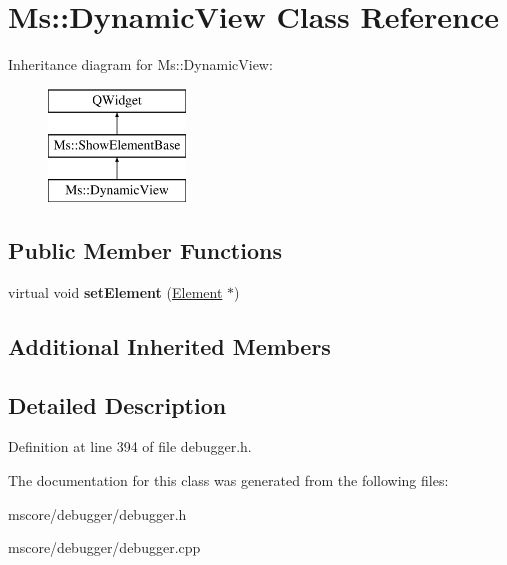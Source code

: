 \hypertarget{class_ms_1_1_dynamic_view}{}\section{Ms\+:\+:Dynamic\+View Class Reference}
\label{class_ms_1_1_dynamic_view}
Inheritance diagram for Ms\+:\+:Dynamic\+View\+:\begin{figure}[H]
\begin{center}
\leavevmode
\includegraphics[height=3.000000cm]{class_ms_1_1_dynamic_view}
\end{center}
\end{figure}
\subsection*{Public Member Functions}
\begin{DoxyCompactItemize}
\item 
\mbox{\label{class_ms_1_1_dynamic_view_af5c738aed74c6050c2a4a7a5319ef8fb}} 
virtual void {\bfseries set\+Element} (\hyperlink{class_ms_1_1_element}{Element} $\ast$)
\end{DoxyCompactItemize}
\subsection*{Additional Inherited Members}


\subsection{Detailed Description}


Definition at line 394 of file debugger.\+h.



The documentation for this class was generated from the following files\+:\begin{DoxyCompactItemize}
\item 
mscore/debugger/debugger.\+h\item 
mscore/debugger/debugger.\+cpp\end{DoxyCompactItemize}
